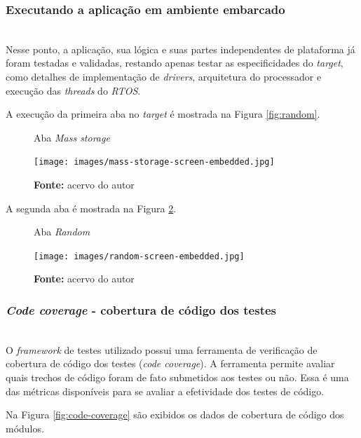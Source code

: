 \documentclass[times, twoside, watermark]{artigo}
\begin{document}
\subsubsection{Executando a aplicação em ambiente embarcado}\hfill\\

Nesse ponto, a aplicação, sua lógica e suas partes independentes de plataforma já 
foram testadas e validadas, restando apenas testar as especificidades do
\textit{target}, como detalhes de implementação de \textit{drivers}, arquitetura
do processador e execução das \textit{threads} do \textit{RTOS}.

A execução da primeira aba no \textit{target} é mostrada na 
Figura \ref{fig:random}.\hfill\

\begin{figure}[H]
  \centering
  \caption{Aba \textit{Mass storage}}
  \texttt{[image: images/mass-storage-screen-embedded.jpg]}
  \caption*{\newline\textbf{Fonte:} acervo do autor}
  \label{fig:mass-storage-embedded}
\end{figure}

A segunda aba é mostrada na Figura \ref{fig:random-embedded}.\hfill\

\begin{figure}[H]
  \centering
  
  \caption{Aba \textit{Random}}
  \texttt{[image: images/random-screen-embedded.jpg]}
  \caption*{\newline\textbf{Fonte:} acervo do autor}
  \label{fig:random-embedded}
\end{figure}

\subsubsection{\textit{Code coverage} - cobertura de código dos testes}\hfill\\

O \textit{framework} de testes utilizado possui uma ferramenta de verificação 
de cobertura de código dos testes (\textit{code coverage}). A ferramenta permite 
avaliar quais trechos de código foram de fato submetidos aos testes ou não.
Essa é uma das métricas disponíveis para se avaliar a efetividade dos testes de 
código.

Na Figura \ref{fig:code-coverage} são exibidos os dados de cobertura de código 
dos módulos. \hfill\\
\end{document}
